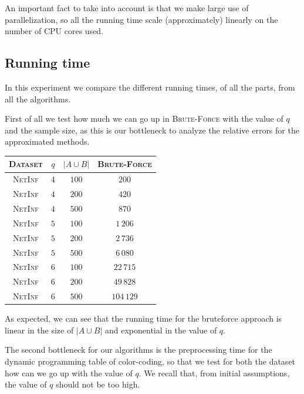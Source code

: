 An important fact to take into account is that we make large use of parallelization, 
so all the running time scale (approximately) linearly on the number of CPU cores used.

\subsection*{Running time}

In this experiment we compare the different running times, of all the parts, from all the algorithms. %
\medskip

First of all we test how much we can go up in \textsc{Brute-Force} with the value of $q$ and the sample size, as this is our bottleneck to analyze the relative errors for the approximated methods.\medskip 

\begin{table}[h]
	\centering
	\begin{tabular}{|c|c|c|c|}
		\hline
		\textsc{Dataset} & $q$ & $|A \cup B|$ & \textsc{Brute-Force} \\ \hline \hline
		\textsc{NetInf}  & $4$ & $100$        & $200$                \\ \hline
		\textsc{NetInf}  & $4$ & $200$        & $420$                \\ \hline
		\textsc{NetInf}  & $4$ & $500$        & $870$                \\ \hline \hline
		\textsc{NetInf}  & $5$ & $100$        & $1\,206$             \\ \hline
		\textsc{NetInf}  & $5$ & $200$        & $2\,736$             \\ \hline
		\textsc{NetInf}  & $5$ & $500$        & $6\,080$             \\ \hline \hline
		\textsc{NetInf}  & $6$ & $100$        & $22\,715$            \\ \hline
		\textsc{NetInf}  & $6$ & $200$        & $49\,828$            \\ \hline
		\textsc{NetInf}  & $6$ & $500$        & $104\,129$           \\ \hline
	\end{tabular}
\end{table}

As expected, we can see that the running time for the bruteforce approach is linear in the size of $|A \cup B|$ and exponential in the value of $q$.\medskip

The second bottleneck for our algorithms is the preprocessing time for the dynamic programming table of color-coding, so that we test for both the dataset how can we go up with the value of $q$. We recall that, from initial assumptions, the value of $q$ should not be too high. 

